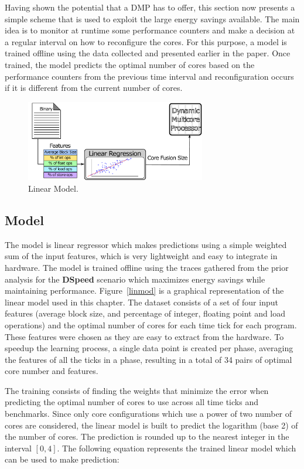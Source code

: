 Having shown the potential that a DMP has to offer, this section now presents a simple scheme that is used to exploit the large energy savings available.
The main idea is to monitor at runtime some performance counters and make a decision at a regular interval on how to reconfigure the cores.
For this purpose, a model is trained offline using the data collected and presented earlier in the paper.
Once trained, the model predicts the optimal number of cores based on the performance counters from the previous time interval and reconfiguration occurs if it is different from the current number of cores.

\begin{figure}[t]
    \centering
	\includegraphics[width=0.7\textwidth]{cases-paper/graphics/other/model2.pdf}
    \caption{Linear Model.}
    \label{fig:linmod}
\end{figure}

\subsection{Model}

The model is linear regressor which makes predictions using a simple weighted sum of the input features, which is very lightweight and easy to integrate in hardware.
The model is trained offline using the traces gathered from the prior analysis for the \textbf{DSpeed} scenario which maximizes energy savings while maintaining performance.
Figure~\ref{linmod} is a graphical representation of the linear model used in this chapter.
The dataset consists of a set of four input features (average block size, and percentage of integer, floating point and load operations) and the optimal number of cores for each time tick for each program.
These features were chosen as they are easy to extract from the hardware.
To speedup the learning process, a single data point is created per phase, averaging the features of all the ticks in a phase, resulting in a total of 34 pairs of optimal core number and features.

The training consists of finding the weights that minimize the error when predicting the optimal number of cores to use across all time ticks and benchmarks.
Since only core configurations which use a power of two number of cores are considered, the linear model is built to predict the logarithm (base 2) of the number of cores.
The prediction is rounded up to the nearest integer in the interval $[0,4]$.
The following equation represents the trained linear model which can be used to make prediction:

